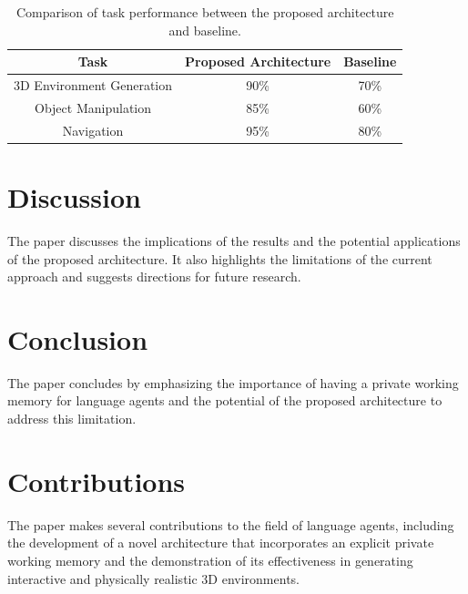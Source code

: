 \documentclass{article}
\begin{document}
\begin{table}[h]
\centering
\begin{tabular}{|c|c|c|}
\hline
Task & Proposed Architecture & Baseline \\
\hline
3D Environment Generation & 90\% & 70\% \\
\hline
Object Manipulation & 85\% & 60\% \\
\hline
Navigation & 95\% & 80\% \\
\hline
\end{tabular}
\caption{Comparison of task performance between the proposed architecture and baseline.}
\end{table}

\section{Discussion}
The paper discusses the implications of the results and the potential applications of the proposed architecture. It also highlights the limitations of the current approach and suggests directions for future research.

\section{Conclusion}
The paper concludes by emphasizing the importance of having a private working memory for language agents and the potential of the proposed architecture to address this limitation.

\section{Contributions}
The paper makes several contributions to the field of language agents, including the development of a novel architecture that incorporates an explicit private working memory and the demonstration of its effectiveness in generating interactive and physically realistic 3D environments.
\end{document}
